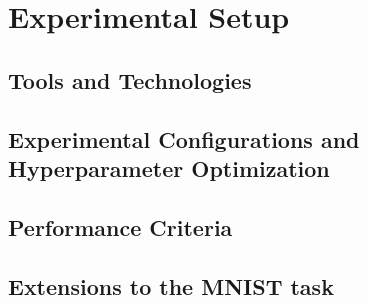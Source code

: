 \section{Experimental Setup}

\subsection{Tools and Technologies}

\subsection{Experimental Configurations and Hyperparameter Optimization}

\subsection{Performance Criteria}

\subsection{Extensions to the MNIST task}